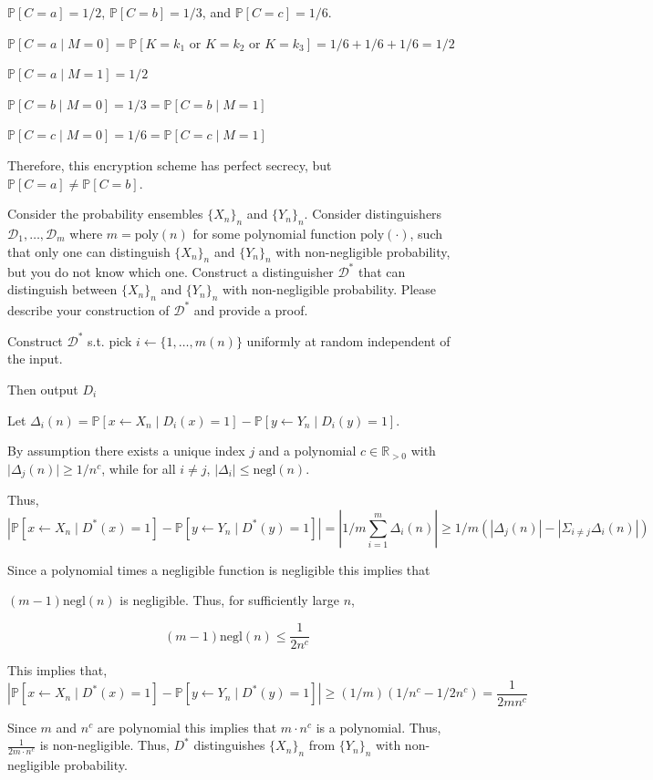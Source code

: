 \documentclass[12pt, letterpaper]{article}
\newcommand{\R}{\mathbb{R}}
\renewcommand{\P}{\mathbb{P}}
\renewcommand{\t}[1]{\text{#1}}
\begin{document}
\begin{problemproof}
    $\P[C=a]=1/2$, $\P[C=b]=1/3$, and $\P[C=c]=1/6$.

    $\P[C=a \mid M = 0] = \P[K=k_1 \t{ or } K=k_2 \t{ or } K=k_3]=1/6+1/6+1/6=1/2$

    $\P[C=a \mid M = 1] = 1/2$

    $\P[C=b \mid M = 0] = 1/3 = \P[C=b \mid M = 1]$

    $\P[C=c \mid M = 0] = 1/6 = \P[C=c \mid M = 1]$

    Therefore, this encryption scheme has perfect secrecy, but $\P[C=a] \neq \P[C=b]$.
\end{problemproof}

\begin{problem}{}
    Consider the probability ensembles $\{X_n\}_n$ and 
$\{Y_n\}_n$. Consider distinguishers $\mathcal{D}_1, \ldots, \mathcal{D}_m$ where 
$m = \t{poly}(n)$ 
for some polynomial function $\t{poly}(\cdot)$, 
such that only one can distinguish $\{X_n\}_n$ and $\{Y_n\}_n$ 
with non-negligible probability, but you do not know which one. 
Construct a distinguisher $\mathcal{D}^*$ that can distinguish between $\{X_n\}_n$ 
and $\{Y_n\}_n$ with non-negligible probability. 
Please describe your construction of $\mathcal{D}^*$ and provide a proof. 
\end{problem}
\begin{problemproof}
    Construct $\mathcal{D}^*$ s.t. pick $i \leftarrow \{1,\dots, m(n)\}$ uniformly at random independent of the input.

    Then output $D_i$

    Let $\Delta_i(n)=\P[x \leftarrow X_n \mid D_i(x)=1]-\P[y \leftarrow Y_n \mid D_i(y)=1]$.

    By assumption there exists a unique index $j$ and a polynomial $c \in \R_{>0}$ with $\mid \Delta_j(n) \mid \geq 1/n^c$,
    while for all $i \neq j$, $|\Delta_i| \leq \t{negl}(n)$.

    Thus, 
    \[|\P[x \leftarrow X_n \mid D^*(x)=1]-\P[y \leftarrow Y_n \mid D^*(y)=1]|= \left\lvert 1/m \sum_{i=1}^m \Delta_i(n)\right\rvert \geq 1/m(|\Delta_j(n)| - |\Sigma_{i \neq j} \Delta_i(n)|) \]

    Since a polynomial times a negligible function is negligible this implies that 
    
    $(m-1) \t{negl}(n)$ is negligible. Thus, for sufficiently large $n$,

    \[(m-1) \t{negl}(n) \leq \dfrac{1}{2n^c}\]

    This implies that,
    \[|\P[x \leftarrow X_n \mid D^*(x)=1]-\P[y \leftarrow Y_n \mid D^*(y)=1]| \geq (1/m)(1/n^c - 1/2n^c) = \frac{1}{2m n^c}\]

    Since $m$ and $n^c$ are polynomial this implies that $m \cdot n^c$ is a polynomial. Thus, $\frac{1}{2m \cdot n^c}$ is non-negligible. Thus, $D^*$ distinguishes $\{X_n\}_n$ from $\{Y_n\}_n$ with non-negligible probability.
\end{problemproof}
\end{document}
